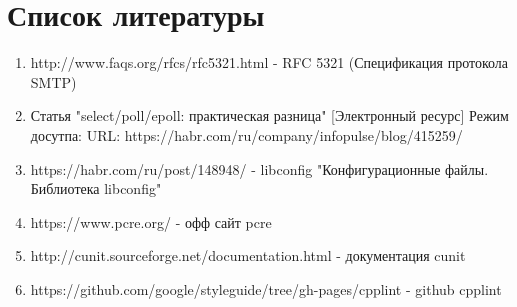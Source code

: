 \documentclass[a4paper,12pt]{report}
\begin{document}
\newpage
\chapter*{Список литературы}

\begin{enumerate}
	\item http://www.faqs.org/rfcs/rfc5321.html - RFC 5321 (Спецификация протокола SMTP)
	\item Статья "select/poll/epoll: практическая разница" [Электронный ресурс] Режим досутпа: URL: https://habr.com/ru/company/infopulse/blog/415259/
	\item https://habr.com/ru/post/148948/ - libconfig "Конфигурационные файлы. Библиотека libconfig" 
	\item https://www.pcre.org/ - офф сайт pcre  
	\item http://cunit.sourceforge.net/documentation.html - документация cunit
	\item https://github.com/google/styleguide/tree/gh-pages/cpplint - github cpplint
	
\end{enumerate}

\lstlistoflistings
\end{document}
